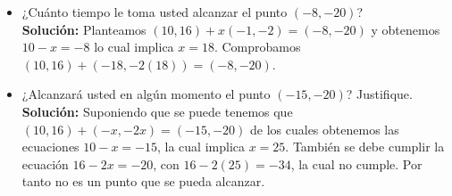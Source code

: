 \documentclass[10pt,letterpaper,fleqn]{article}
\begin{document}
\begin{enumerate}
\begin{itemize}
            \item ¿Cuánto tiempo le toma usted alcanzar el punto $(-8,-20)$?\\
            \textbf{Solución:} Planteamos $(10,16)+x(-1,-2)=(-8,-20)$ y obtenemos $10-x=-8$ lo cual implica $x=18$. Comprobamos $(10,16)+(-18,-2(18))=(-8,-20)$.

            \item ¿Alcanzará usted en algún momento el punto $(-15,-20)$? Justifique.\\
            \textbf{Solución:} Suponiendo que se puede tenemos que $(10,16)+(-x,-2x)=(-15,-20)$ de los cuales obtenemos las ecuaciones $10-x=-15$, la cual implica $x=25$. También se debe cumplir la ecuación $16-2x=-20$, con $16-2(25)=-34$, la cual no cumple. Por tanto no es un punto que se pueda alcanzar.

        \end{itemize}

    \end{enumerate}
\end{document}
